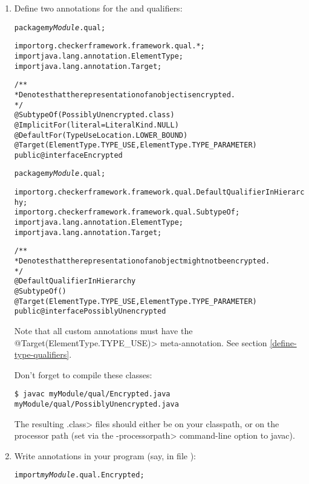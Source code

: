 \begin{enumerate}
\item
Define two annotations for the  and  qualifiers:

\begin{alltt}
package \textit{myModule}.qual;

import org.checkerframework.framework.qual.*;
import java.lang.annotation.ElementType;
import java.lang.annotation.Target;

/**
 * Denotes that the representation of an object is encrypted.
 */
@SubtypeOf(PossiblyUnencrypted.class)
@ImplicitFor(literal= { LiteralKind.NULL })
@DefaultFor({TypeUseLocation.LOWER_BOUND})
@Target({ElementType.TYPE_USE, ElementType.TYPE_PARAMETER})
public @interface Encrypted {}
\end{alltt}

\begin{alltt}
package \textit{myModule}.qual;

import org.checkerframework.framework.qual.DefaultQualifierInHierarchy;
import org.checkerframework.framework.qual.SubtypeOf;
import java.lang.annotation.ElementType;
import java.lang.annotation.Target;

/**
 * Denotes that the representation of an object might not be encrypted.
 */
@DefaultQualifierInHierarchy
@SubtypeOf({})
@Target({ElementType.TYPE_USE, ElementType.TYPE_PARAMETER})
public @interface PossiblyUnencrypted {}
\end{alltt}

Note that all custom annotations must have the
\<@Target({ElementType.TYPE\_USE})> meta-annotation. See section
\ref{define-type-qualifiers}.

Don't forget to compile these classes:

\begin{Verbatim}
$ javac myModule/qual/Encrypted.java myModule/qual/PossiblyUnencrypted.java
\end{Verbatim}

The resulting \<.class> files should either be on your classpath, or on the
processor path (set via the \<-processorpath> command-line option to javac).

\item
  Write  annotations in your program (say, in file
  ):

\begin{alltt}
import \textit{myModule}.qual.Encrypted;


\end{alltt}
\end{enumerate}
